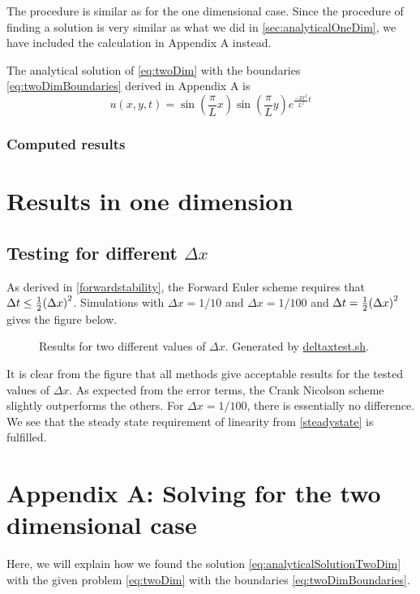 \documentclass[12pt,english,a4paper]{article}
\newcommand{\program}[1]{\href{https://github.com/anjohan/Project5/blob/master/#1}{#1}}
\begin{document}
The procedure is similar as for the one dimensional case. Since the procedure of finding a solution is very similar as what we did in \vref{sec:analyticalOneDim}, we have included the calculation in Appendix A instead.

The analytical solution of \vref{eq:twoDim} with the boundaries \vref{eq:twoDimBoundaries} derived in Appendix A is
\begin{equation} \label{eq:analyticalSolutionTwoDim}
u(x,y,t) = \sin(\frac{\pi}{L}x)\sin(\frac{\pi}{L}y)e^{\frac{-2\pi^2}{L^2}t}
\end{equation}

\subsubsection{Computed results}
%
\section{Results in one dimension}
\subsection{Testing for different \(\Delta x\)}
As derived in \ref{forwardstability}, the Forward Euler scheme requires that \(\Delta t \leq \tfrac{1}{2}\qty(\Delta x)^2\). Simulations with \(\Delta x = 1/10\) and \(\Delta x = 1/100\) and \(\Delta t = \tfrac{1}{2}\qty(\Delta x)^2\) gives the figure below.
\begin{figure}[H]
\centering

\caption{Results for two different values of \(\Delta x\). Generated by \program{deltaxtest.sh}.}
\end{figure}
It is clear from the figure that all methods give acceptable results for the tested values of \(\Delta x\). As expected from the error terms, the Crank Nicolson scheme slightly outperforms the others. For \(\Delta x=1/100\), there is essentially no difference. We see that the steady state requirement of linearity from \ref{steadystate} is fulfilled.




\clearpage
{}
\nocite{tveito2004introduction}
\printbibliography
\newpage
\section{Appendix A: Solving for the two dimensional case}
Here, we will explain how we found the solution \vref{eq:analyticalSolutionTwoDim} with the given problem \vref{eq:twoDim} with the boundaries \vref{eq:twoDimBoundaries}.
\end{document}
